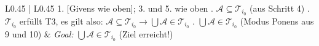 \documentclass{article}
\begin{document}
\begin{center}
\begin{tabular}{ L{0.45\textwidth} | L{0.45\textwidth} }
1. [Givens wie oben]; 3. und 5. wie oben . $\mathcal{A} \subseteq \mathcal{T}_{i_0}$ (aus Schritt 4) . $\mathcal{T}_{i_0}$ erfüllt T3, es gilt also: \newline
\phantom{XX} $\mathcal{A} \subseteq \mathcal{T}_{i_0} \rightarrow \bigcup \mathcal{A} \in \mathcal{T}_{i_0}$ . $\bigcup \mathcal{A} \in \mathcal{T}_{i_0}$ (Modus Ponens aus 9 und 10) &
\emph{Goal:} $\bigcup \mathcal{A} \in \mathcal{T}_{i_0}$ \newline
\newline
\checkmark \quad (Ziel erreicht!) \\
\bottomrule
\end{tabular}
\end{center}
\end{document}

